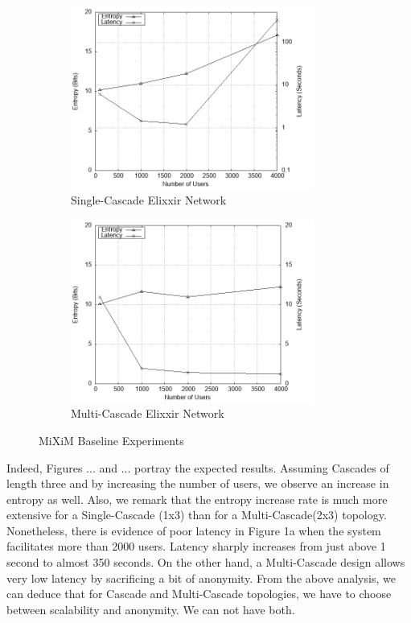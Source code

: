 \documentclass[logo,msc,cyber]{infthesis}   %
\begin{document}
\begin{figure}[h!]
    \centering
    \begin{subfigure}[b]{0.45\textwidth}
        \centering
        \includegraphics[height=6cm]{figures/simulator/1_a.png}
        \caption{Single-Cascade Elixxir Network}
        \label{fig:elixxir-cascade}
    \end{subfigure}
    \hfill
    \begin{subfigure}[b]{0.45\textwidth}
        \centering
        \includegraphics[height=6cm]{figures/simulator/1_b.png}
        \caption{Multi-Cascade Elixxir Network}
        \label{fig:elixxir-multi-cascade}
    \end{subfigure}
       \caption{MiXiM Baseline Experiments}
       \label{fig:elixxir}
 \end{figure}


 Indeed, Figures ... and ... portray the expected results. Assuming Cascades of
 length three and by increasing the number of users, we observe an increase in
 entropy as well. Also, we remark that the entropy increase rate is much more
 extensive for a Single-Cascade (1x3) than for a Multi-Cascade(2x3) topology.
 Nonetheless, there is evidence of poor latency in Figure 1a when the system
 facilitates more than 2000 users. Latency sharply increases from just above 1
 second to almost 350 seconds. On the other hand, a Multi-Cascade design allows
 very low latency by sacrificing a bit of anonymity. From the above analysis, we
 can deduce that for Cascade and Multi-Cascade topologies, we have to choose
 between scalability and anonymity. We can not have both.
\end{document}
